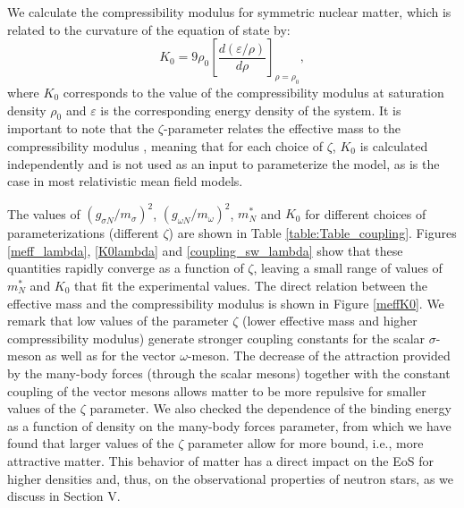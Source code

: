 \documentclass[twocolumn,showpacs,aps]{revtex4}
\begin{document}
We calculate the compressibility modulus for symmetric nuclear matter, which is related to the curvature of the equation of state by:
\begin{equation}
\label{compressibility}
K_0= 9 \rho_0 \left[ \frac{d(\varepsilon/\rho)}{d\rho} \right]_{\rho=\rho_0},
\end{equation}
where $K_0$ corresponds to the value of the compressibility modulus at saturation density $\rho_0$ and $\varepsilon$ is the corresponding energy density of the system.
It is important to note that the $\zeta$-parameter relates the effective mass to the compressibility modulus \cite{Dexheimer:2007mt},
meaning that for each choice of $\zeta$, $K_0$ is calculated independently and is not used as an input to parameterize the model,
as is the case in most relativistic mean field models.

The values of $(g_{\sigma N}/m_{\sigma})^2$, $(g_{\omega N}/m_{\omega})^2$, $m^*_N$ and $K_0$ for different 
choices of parameterizations (different $\zeta$) are shown in Table \ref{table:Table_coupling}.
Figures \ref{meff_lambda}, \ref{K0lambda} and \ref{coupling_sw_lambda} show 
that these quantities rapidly converge as a function of $\zeta$,
leaving a small range of values of $m^*_N$ and $K_0$ that fit the experimental values.
The direct relation between the effective mass and the compressibility modulus is shown in Figure \ref{meffK0}.
We remark that low values of the parameter $\zeta$ (lower effective mass and higher compressibility modulus) 
generate stronger coupling constants for the scalar $\sigma$-meson as well as for the vector $\omega$-meson.
The decrease of the attraction provided by the many-body forces (through the scalar mesons) together with the constant coupling of the 
vector mesons allows matter to be more repulsive for smaller values of the $\zeta$ parameter.
We also checked the dependence of the binding energy as a function of density on the many-body forces parameter,
from which we have found that larger values of the $\zeta$ parameter allow for more bound, i.e., more attractive matter.
This behavior of matter has a direct impact on the EoS for higher densities and, thus, on the
observational properties of neutron stars, as we discuss in Section V.
\end{document}
